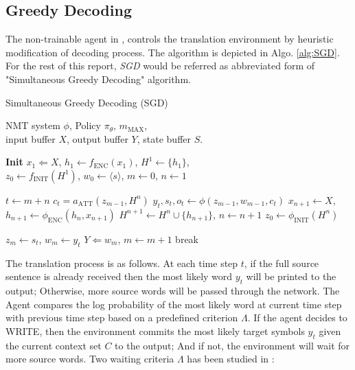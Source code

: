\documentclass{sfuthesis}
\begin{document}
\subsection{Greedy Decoding}\label{sub:SNMT1}
The non-trainable agent in \cite{cho:2016:Arxive}, controls the translation environment by heuristic modification of decoding process. The algorithm is depicted in Algo. \ref{alg:SGD}. For the rest of this report, \emph{SGD} would be referred as abbreviated form of "Simultaneous Greedy Decoding" algorithm.

\begin{algorithm}[H]
\caption{Simultaneous Greedy Decoding (SGD)}
\begin{algorithmic}[1] \label{alg:SGD}
\REQUIRE NMT system $\phi$, Policy $\pi_{\theta}$, $m_{\text{MAX}}$,\\
         input buffer $X$, output buffer $Y$, state buffer $S$.

\STATE \textbf{Init} $x_1 \Leftarrow X$, $h_1 \leftarrow f_{\text{ENC}}(x_1) $, $H^{1} \leftarrow \{h_1\}$,\\
    $z_0 \leftarrow f_{\text{INIT}}(H^1)$, $w_0 \leftarrow \langle s \rangle$, $m \leftarrow 0$, $n \leftarrow 1$

\STATE $t \leftarrow m + n $
\STATE $c_{t} = a_{\textrm{ATT}}(z_{m-1}, H^n)$
\STATE $y_{t}, s_{t}, o_{t} \leftarrow \phi(z_{m-1}, w_{m-1}, c_{t})$
\STATE $x_{n+1} \leftarrow X$, $h_{n+1} \leftarrow \phi_{\text{ENC}}(h_n, x_{n+1})$
\STATE $H^{n+1} \leftarrow H^{n} \cup \{ h_{n + 1} \}$, $n \leftarrow n + 1$
 \STATE $z_0 \leftarrow \phi_{\text{INIT}}(H^{n})$ \ENDIF

\STATE $z_{m} \leftarrow s_{t}$, $w_{m} \leftarrow y_{t}$
\STATE $Y \Leftarrow w_{m}$, $m \leftarrow m + 1$
\ENDIF
 \STATE break \ENDIF
\ENDWHILE
\end{algorithmic}
\end{algorithm}

The translation process is as follows. At each time step $t$, if the full source sentence is already received then the most likely word $y_t$ will be printed to the output; Otherwise, more source words will be passed through the network. The Agent compares the log probability of the most likely word at current time step with previous time step based on a predefined criterion $\Lambda$. If the agent decides to WRITE, then the environment commits the most likely target symbols $y_t$ given the current context set $C$ to the output; And if not, the environment will wait for more source words. Two waiting criteria $\Lambda$ has been studied in \cite{cho:2014:arxive}:
\end{document}
